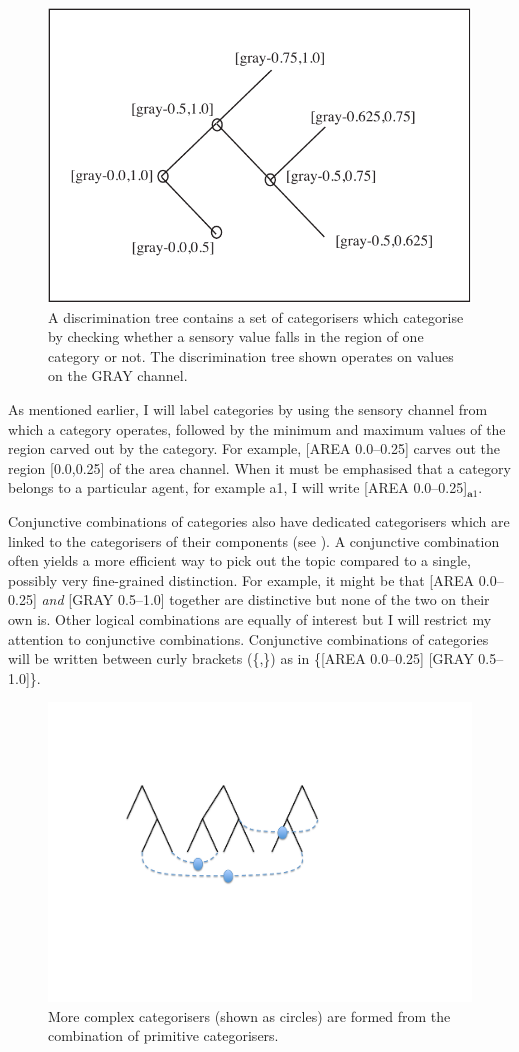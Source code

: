 \begin{figure}[htbp]
  \centerline{\includegraphics[width=.65\textwidth]{chap4/figs/tree.pdf}}
\caption{\label{trees}A discrimination tree contains
a set of categorisers which categorise by checking whether
a sensory value falls in the region of one category or 
not. The discrimination tree shown operates on
values on the GRAY channel.}
\end{figure}

As mentioned earlier, I will label categories
by using the sensory channel from which a category operates, 
followed by the minimum and maximum values of the region
carved out by the category. For example, 
[AREA 0.0–0.25] carves out the region [0.0,0.25] of the 
area channel. When it must be emphasised that 
a category belongs to a particular agent, for 
example {\bfshape a1}, I will write [AREA 0.0–0.25]$_{\mathbf a1}$. 

Conjunctive combinations of categories also have
dedicated categorisers which are linked to 
the categorisers of their components (see 
). A conjunctive combination 
often yields a more efficient way to pick out 
the topic compared to a single, possibly very fine-grained
distinction. For example, it might be that 
[AREA 0.0–0.25] {\itshape and} [GRAY 0.5–1.0]
together are distinctive but none of the two on their
own is. Other logical combinations are equally of interest
but I will restrict my attention to conjunctive 
combinations. Conjunctive combinations of categories 
will be written between curly brackets (\{,\}) as in 
\{[AREA 0.0–0.25] [GRAY 0.5–1.0]\}. 

\begin{figure}[htbp]
  \centerline{\includegraphics[width=.65\textwidth]{chap4/figs/disnet.pdf}}
\caption{\label{disnet}More complex categorisers
(shown as circles) are formed from the combination
of primitive categorisers.}
\end{figure}

